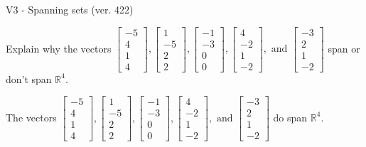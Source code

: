 \begin{exercise}
  \begin{exerciseTitle}V3 - Spanning sets (ver. 422)\end{exerciseTitle}
  \begin{exerciseStatement}
    Explain why the vectors \(\left[\begin{array}{r}
-5 \\
4 \\
1 \\
4
\end{array}\right] , \left[\begin{array}{r}
1 \\
-5 \\
2 \\
2
\end{array}\right] , \left[\begin{array}{r}
-1 \\
-3 \\
0 \\
0
\end{array}\right] , \left[\begin{array}{r}
4 \\
-2 \\
1 \\
-2
\end{array}\right] , \text{ and } \left[\begin{array}{r}
-3 \\
2 \\
1 \\
-2
\end{array}\right]\) span or don't span \(\mathbb{R}^4\). 
	


  \end{exerciseStatement}
  \begin{exerciseAnswer}
   The vectors \(\left[\begin{array}{r}
-5 \\
4 \\
1 \\
4
\end{array}\right] , \left[\begin{array}{r}
1 \\
-5 \\
2 \\
2
\end{array}\right] , \left[\begin{array}{r}
-1 \\
-3 \\
0 \\
0
\end{array}\right] , \left[\begin{array}{r}
4 \\
-2 \\
1 \\
-2
\end{array}\right] , \text{ and } \left[\begin{array}{r}
-3 \\
2 \\
1 \\
-2
\end{array}\right]\) 
  	 do  
	span \(\mathbb{R}^4\).
  



\end{exerciseAnswer}
\end{exercise}
